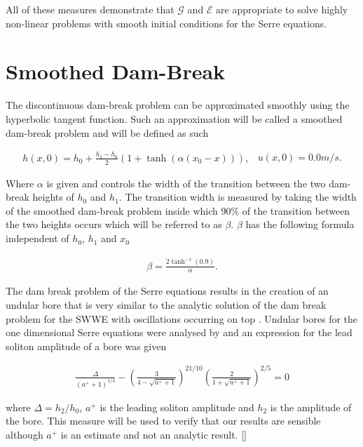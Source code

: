 \documentclass[SingleSpace,12pt,Journal]{Serre_ASCE}
\begin{document}
All of these measures demonstrate that $\mathcal{G}$ and $\mathcal{E}$ are appropriate to solve highly non-linear problems with smooth initial conditions for the Serre equations. 

\section{Smoothed Dam-Break}
\label{section:smootheddambreak}
The discontinuous dam-break problem can be approximated smoothly using the hyperbolic tangent function. Such an approximation will be called a smoothed dam-break problem and will be defined as such
\begin{linenomath*}
\begin{subequations}
\begin{gather}
h(x,0) = h_0 + \frac{h_1 - h_0}{2}\left(1 + \tanh\left(\alpha\left(x_0 - x\right)\right)\right),
\end{gather}
\begin{gather}
u(x,0) = 0.0m/s.
\end{gather}
\end{subequations}
\label{eq:sdbi}
\end{linenomath*}
Where $\alpha$ is given and controls the width of the transition between the two dam-break heights of $h_0$ and $h_1$. The transition width is measured by taking the width of the smoothed dam-break problem inside which $90 \%$ of the transition between the two heights occurs which will be referred to as $\beta$. $\beta$ has the following formula independent of $h_0$, $h_1$ and $x_0$
\begin{linenomath*}
\begin{gather}
\beta = \frac{2 \tanh^{-1}\left(0.9\right)}{\alpha}.
\end{gather}
\label{eq:sdbtrans}
\end{linenomath*}
The dam break problem  of the Serre equations results in the creation of an undular bore that is very similar to the analytic solution of the dam break problem for the SWWE with oscillations occurring on top \cite{Hank-etal-2010-2034}. Undular bores for the one dimensional Serre equations were analysed by  and an expression for the lead soliton amplitude of a bore was given
\begin{linenomath*}
\begin{gather}
\frac{\Delta}{\left(a^+ + 1\right)^{1/4}} - \left(\frac{3}{4 -  \sqrt{a^+ + 1}}\right)^{21/10} \left(\frac{2}{1 + \sqrt{a^+ + 1}}\right)^{2/5} = 0
\label{eq:aplusdef}
\end{gather}
\end{linenomath*}
where $\Delta = h_2 / h_0$, $a^+$ is the leading soliton amplitude and $h_2$ is the amplitude of the bore. This measure will be used to verify that our results are sensible although $a^+$ is an estimate and not an analytic result. [] 
\end{document}
